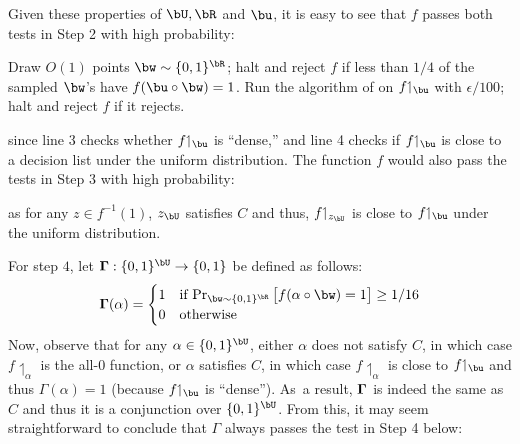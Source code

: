 \documentclass[11pt]{article}
\theoremstyle{definition}
\begin{document}
Given these properties of $\bU,\bR$ and $\bu$, it is easy to see that $f$ passes both tests in Step 2 with high probability:
\medskip

\begin{algorithm}[H]\begin{algorithmic}[1]\vspace{0.2cm}
    \setcounter{ALG@line}{2}
        \State Draw  $O(1)$ points $\bw\sim \{0,1\}^{\bR}$;
    halt and reject 
    $f$
if less than $1/4$ of the sampled $\bw$'s have  $f(\bu\circ \bw)=1$. \State Run the algorithm of  on $f{\upharpoonleft_{\bu}}$ with $\epsilon/100$;
     halt and reject $f$ if it rejects.\vspace{0.15cm}
    \end{algorithmic}
\end{algorithm}\medskip

\noindent since line 3 checks whether $f{\upharpoonleft_{\bu}}$ is ``dense,'' and line 4 checks if $f{\upharpoonleft_{\bu}}$ is close to a decision list under the uniform distribution. The function
$f$ would also pass  the tests in Step 3 
 with high probability: \medskip

\begin{algorithm}[H]
\end{algorithm}\medskip
\noindent as for any $z\in f^{-1}(1)$, $z_{\bU}$ satisfies $C$ and thus,
$f{\upharpoonleft_{z_{\bU}}}$ is close to $f{\upharpoonleft_{\bu}}$ under the uniform distribution.

For step $4$, let $\bGamma:\{0,1\}^{\bU}\rightarrow \{0,1\}$ be
  defined as follows:
$$\bGamma(\alpha)=\begin{cases}
         1 & \text{if $\Pr_{\bw \sim \{0,1\}^{\bR} }\big[f(\alpha \circ \bw)=1\big] \ge 1/16$} \\
         0 &\text{otherwise}
    \end{cases}$$
Now, observe that for any $\alpha\in \{0,1\}^{\bU}$,  
  either $\alpha$ does not satisfy $C$, in which case
$f{\upharpoonleft_{\alpha}}$ is the all-$0$ function,
  or $\alpha$ satisfies $C$, in which case 
$f{\upharpoonleft_{\alpha}}$ is close to 
  $f{\upharpoonleft_{\bu}}$ and thus
  $\Gamma(\alpha)=1$ (because $f{\upharpoonleft_{\bu}}$ is ``dense'').
As~a result, $\mathbf{\Gamma}$ is indeed the same as $C$ and thus it is a conjunction over $\{0,1\}^{\bU}$. From this, it may seem straightforward to conclude that $\Gamma$
  always passes the test in Step 4 below:\medskip 
  
\end{document}
